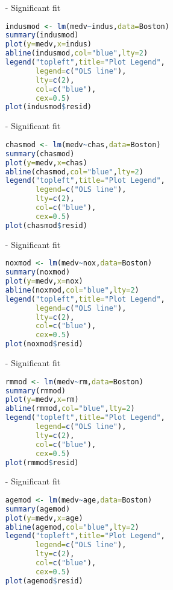 \documentclass[11pt]{report}
\begin{document}
\begin{itemize}
\item[-] Significant fit


\begin{lstlisting}[language=R]
indusmod <- lm(medv~indus,data=Boston)
summary(indusmod) 
plot(y=medv,x=indus) 
abline(indusmod,col="blue",lty=2)
legend("topleft",title="Plot Legend",
       legend=c("OLS line"),
       lty=c(2),
       col=c("blue"),
       cex=0.5)
plot(indusmod$resid)
\end{lstlisting}

\item[-] Significant fit



\begin{lstlisting}[language=R]
chasmod <- lm(medv~chas,data=Boston)
summary(chasmod) 
plot(y=medv,x=chas) 
abline(chasmod,col="blue",lty=2)
legend("topleft",title="Plot Legend",
       legend=c("OLS line"),
       lty=c(2),
       col=c("blue"),
       cex=0.5)
plot(chasmod$resid) 
\end{lstlisting}

\item[-] Significant fit

\begin{lstlisting}[language=R]
noxmod <- lm(medv~nox,data=Boston)
summary(noxmod) 
plot(y=medv,x=nox) 
abline(noxmod,col="blue",lty=2)
legend("topleft",title="Plot Legend",
       legend=c("OLS line"),
       lty=c(2),
       col=c("blue"),
       cex=0.5)
plot(noxmod$resid)
\end{lstlisting}

\item[-] Significant fit

\begin{lstlisting}[language=R]
rmmod <- lm(medv~rm,data=Boston)
summary(rmmod) 
plot(y=medv,x=rm) 
abline(rmmod,col="blue",lty=2)
legend("topleft",title="Plot Legend",
       legend=c("OLS line"),
       lty=c(2),
       col=c("blue"),
       cex=0.5)
plot(rmmod$resid)
\end{lstlisting}

\item[-] Significant fit

\begin{lstlisting}[language=R]
agemod <- lm(medv~age,data=Boston)
summary(agemod) 
plot(y=medv,x=age) 
abline(agemod,col="blue",lty=2)
legend("topleft",title="Plot Legend",
       legend=c("OLS line"),
       lty=c(2),
       col=c("blue"),
       cex=0.5)
plot(agemod$resid)
\end{lstlisting}


\end{itemize}
\end{document}
